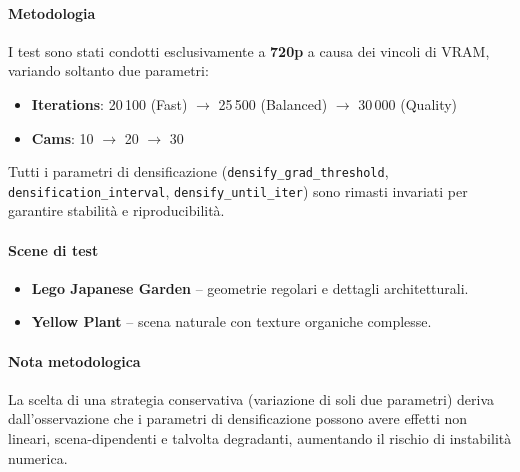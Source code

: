 \paragraph{Metodologia}
I test sono stati condotti esclusivamente a \textbf{720p} a causa dei vincoli di VRAM, 
variando soltanto due parametri:
\begin{itemize}
	\item \textbf{Iterations}: 20\,100 (Fast) $\rightarrow$ 25\,500 (Balanced) $\rightarrow$ 30\,000 (Quality)
	\item \textbf{Cams}: 10 $\rightarrow$ 20 $\rightarrow$ 30
\end{itemize}
Tutti i parametri di densificazione (\texttt{densify\_grad\_threshold}, \texttt{densification\_interval}, 
\texttt{densify\_until\_iter}) sono rimasti invariati per garantire stabilità e riproducibilità.

\paragraph{Scene di test}
\begin{itemize}
	\item \textbf{Lego Japanese Garden} -- geometrie regolari e dettagli architetturali.
	\item \textbf{Yellow Plant} -- scena naturale con texture organiche complesse.
\end{itemize}

\paragraph{Nota metodologica}
La scelta di una strategia conservativa (variazione di soli due parametri) deriva 
dall’osservazione che i parametri di densificazione possono avere effetti non lineari, 
scena-dipendenti e talvolta degradanti, aumentando il rischio di instabilità numerica.

